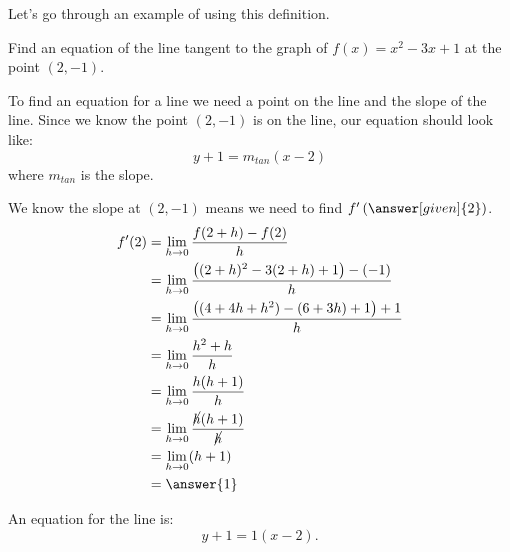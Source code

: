 \documentclass{ximera}
\begin{document}
Let's go through an example of using this definition.
\begin{example}
	Find an equation of the line tangent to the graph of  $f(x) = x^2 - 3x + 1$ at the point $(2, -1)$.
	\begin{explanation}
		To find an equation for a line we need a point on the line and the slope of the line.  Since we know the point
		$(2, -1)$ is on the line, our equation should look like:
		\[ y + 1 = m_{tan} (x-2) \]
		where $m_{tan}$ is the slope.  
		
		We know the slope at $(2, -1)$ means we need to find $f'\left( \answer[given]{2} \right)$.
		\begin{align*}
			f'(2) &= \lim_{h \to 0} \frac{ f(2+h) - f(2) }{h}\\
				&= \lim_{h \to 0} \frac{\left((2+h)^2 - 3(2+h) + 1\right) - \left(  -1 \right)}{h}\\
				&= \lim_{h \to 0} \frac{\left( (4 + 4h + h^2)-(6+3h) + 1\right) +1}{h}\\
				&= \lim_{h \to 0} \frac{h^2+h}{h}\\
				&= \lim_{h \to 0} \frac{h(h+1)}{h}\\
				&= \lim_{h \to 0} \frac{\cancel{h}(h+1)}{\cancel{h}}\\
				&= \lim_{h \to 0} (h+1)\\
				&= \answer{1}
		\end{align*}

		An equation for the line is: \[ y + 1 = 1 (x-2). \]
	\end{explanation}
\end{example}
\end{document}
